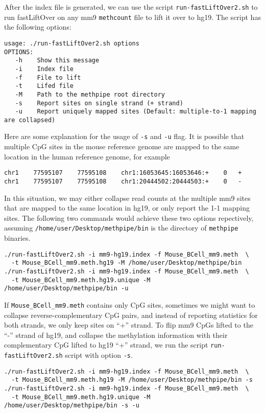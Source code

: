 \documentclass[10pt]{article}
\newcommand{\prog}[1]{\texttt{#1}}
\newcommand{\fn}[1]{\texttt{#1}}
\newcommand{\op}[1]{\texttt{#1}}
\begin{document}
After the index file is generated, we can use the script
\prog{run-fastLiftOver2.sh} to run fastLiftOver on any mm9
\prog{methcount} file to lift it over to hg19.  The script has the
following options:
\begin{verbatim}
usage: ./run-fastLiftOver2.sh options
OPTIONS:
   -h    Show this message
   -i    Index file
   -f    File to lift
   -t    Lifed file
   -M    Path to the methpipe root directory
   -s    Report sites on single strand (+ strand)
   -u    Report uniquely mapped sites (Default: multiple-to-1 mapping are collapsed)
\end{verbatim}
Here are some explanation for the usage of \op{-s} and \op{-u} flag.
It is possible that multiple CpG sites in the mouse reference genome
are mapped to the same location in the human reference genome, for example 
\begin{verbatim}
chr1	77595107	77595108	chr1:16053645:16053646:+	0	+
chr1	77595107	77595108	chr1:20444502:20444503:+	0	-
\end{verbatim}
In this situation, we may either collapse read counts at the multiple
mm9 sites that are mapped to the same location in hg19, or only report
the 1-1 mapping sites. The following two commands would achieve these
two options repectively, assuming \prog{/home/user/Desktop/methpipe/bin}
is the directory of \prog{methpipe} binaries.
\begin{verbatim}
./run-fastLiftOver2.sh -i mm9-hg19.index -f Mouse_BCell_mm9.meth  \
  -t Mouse_BCell_mm9.meth.hg19 -M /home/user/Desktop/methpipe/bin
./run-fastLiftOver2.sh -i mm9-hg19.index -f Mouse_BCell_mm9.meth  \
  -t Mouse_BCell_mm9.meth.hg19.unique -M  /home/user/Desktop/methpipe/bin -u
\end{verbatim}
If \fn{Mouse\_BCell\_mm9.meth} contains only CpG sites, sometimes we
might want to collapse reverse-complementary CpG pairs, and instead of
reporting statistics for both strands, we only keep sites on ``+''
strand. To flip mm9 CpGs lifted to the ``-'' strand of hg19, and
collapse the methylation information with their complementary CpG
lifted to hg19 ``+'' strand, we run the script
\prog{run-fastLiftOver2.sh} script with option \op{-s}.
\begin{verbatim}
./run-fastLiftOver2.sh -i mm9-hg19.index -f Mouse_BCell_mm9.meth  \
  -t Mouse_BCell_mm9.meth.hg19 -M /home/user/Desktop/methpipe/bin -s 
./run-fastLiftOver2.sh -i mm9-hg19.index -f Mouse_BCell_mm9.meth  \
  -t Mouse_BCell_mm9.meth.hg19.unique -M  /home/user/Desktop/methpipe/bin -s -u
\end{verbatim}
\end{document}
